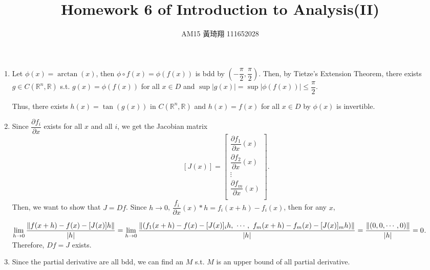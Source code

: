 \documentclass[12pt]{article}
\title{Homework 6 of Introduction to Analysis(II)}
\author{AM15 黃琦翔 111652028}
\begin{document}
\maketitle
\begin{enumerate}
    \item Let $\phi(x) = \arctan(x)$, then $\phi \circ f(x) = \phi(f(x))$ is bdd by $(-\dfrac{\pi}{2}, \dfrac{\pi}{2})$.
    Then, by Tietze's Extension Theorem, there exists $g \in C(\mathbb{R}^n, \mathbb{R})$ s.t. 
    $g(x) = \phi(f(x))$ for all $x\in D$ and $\sup|g(x)| = \sup |\phi(f(x))|\leq \dfrac{\pi}{2}$.

    Thus, there exists $h(x) = \tan(g(x))$ in $C(\mathbb{R}^n, \mathbb{R})$ and $h(x) = f(x)$ for all $x\in D$ by 
    $\phi(x)$ is invertible.

    \item Since $\dfrac{\partial f_i}{\partial x}$ exists for all $x$ and all $i$, 
    we get the Jacobian matrix $$\left[J(x)\right] = \begin{bmatrix}
        \dfrac{\partial f_1}{\partial x}(x)\\
        \dfrac{\partial f_2}{\partial x}(x)\\
        \vdots\\
        \dfrac{\partial f_m}{\partial x}(x)\\
    \end{bmatrix}.$$
    Then, we want to show that $J = Df$.
    Since $h \to 0$, $\dfrac{f_i}{\partial x}(x)*h = f_i(x+h) - f_i(x)$, then for any $x$, 

    $\displaystyle\lim_{h\to 0} \dfrac{\| f(x+h) - f(x) - [J(x)]h\|}{|h|}= \displaystyle\lim_{h\to 0} \dfrac{\| (f_1(x+h) - f(x) - [J(x)]_i h,\ \cdots,\ f_m(x+h) - f_m(x) - [J(x)]_m h)\|}{|h|}\\
    = \dfrac{\| (0, 0, \cdots, 0)\|}{|h|} = 0$.
    Therefore, $Df = J$ exists.

    \item Since the partial derivative are all bdd, we can find an $M$ s.t. $M$ is an upper bound of all partial derivative.
    
\end{enumerate}
\end{document}
